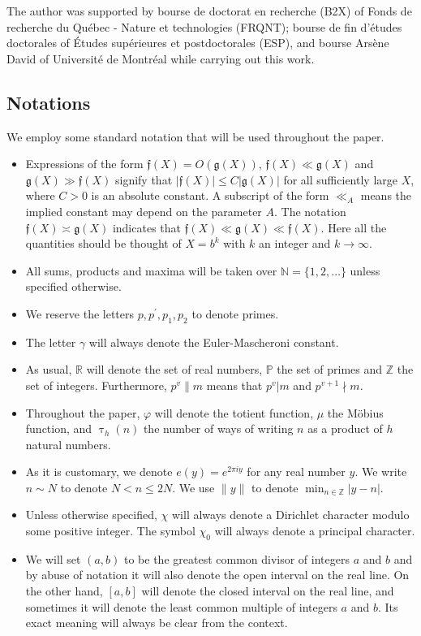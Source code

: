 \documentclass[12pt]{amsart}
\numberwithin{equation}{section}
\theoremstyle{remark}
\theoremstyle{definition}
\begin{document}
The author was supported by bourse de doctorat en recherche (B2X) of  Fonds de recherche du Qu\'ebec - Nature et technologies (FRQNT); bourse de fin d’\'etudes doctorales of \'Etudes sup\'erieures et postdoctorales (ESP), and bourse Ars\`ene David of Universit\'e de Montr\'eal while carrying out this work.


\subsection*{Notations} We employ some standard notation that will be used throughout the paper.
\begin{itemize}
\item Expressions of the form $\mathfrak{f}(X)=O(\mathfrak{g}(X))$, $\mathfrak{f}(X) \ll \mathfrak{g}(X)$ and $\mathfrak{g}(X) \gg \mathfrak{f}(X)$ signify that $|\mathfrak{f}(X)| \leq C|\mathfrak{g}(X)|$ for all sufficiently large $X$, where $C>0$ is an absolute constant. A subscript of the form $\ll_A$ means the implied constant may depend on the parameter $A$. The notation $\mathfrak{f}(X) \asymp \mathfrak{g}(X)$ indicates that $\mathfrak{f}(X) \ll \mathfrak{g}(X) \ll \mathfrak{f}(X)$. Here all the quantities should be thought of $X=b^k$ with $k$ an integer and $k\rightarrow \infty$. 
\item All sums, products and maxima will be taken over $\mathbb{N}=\{1, 2, \dotsc\}$ unless specified otherwise.
 \item We reserve the letters $p, p^\prime, p_1, p_2$ to denote primes. 
\item The letter $\gamma$ will always denote the Euler-Mascheroni constant.
\item As usual, $\mathbb{R}$ will denote the set of real numbers, $\mathbb{P}$ the set of primes and $\mathbb{Z}$ the set of integers. Furthermore, $p^v\|m$ means that $p^v|m$ and $p^{v+1}\nmid m$.
\item Throughout the paper, $\varphi$ will denote the totient function, $\mu$ the M\"{o}bius function, and $\uptau_h(n)$ the number of ways of writing $n$ as a product of $h$ natural numbers. 
\item As it is customary, we denote $e(y)= e^{2\pi i y}$ for any real number $y$. We write $n\sim N$ to denote $ N<n\leq 2N$. We use $\|y\|$ to denote $\min_{n\in \mathbb{Z}}|y-n|$. 
\item Unless otherwise specified, $\chi$ will always denote a Dirichlet character modulo some positive integer. The symbol $\chi_0$ will always denote a principal character.
\item We will set $(a, b)$ to be the greatest common divisor of integers $a$ and $b$ and by abuse of notation it will also denote the open interval on the real line. On the other hand, $[a, b]$ will denote the closed interval on the real line, and sometimes it will denote the least common multiple of integers $a$ and $b$. Its exact meaning will always be clear from the context.

\end{itemize}
\end{document}

